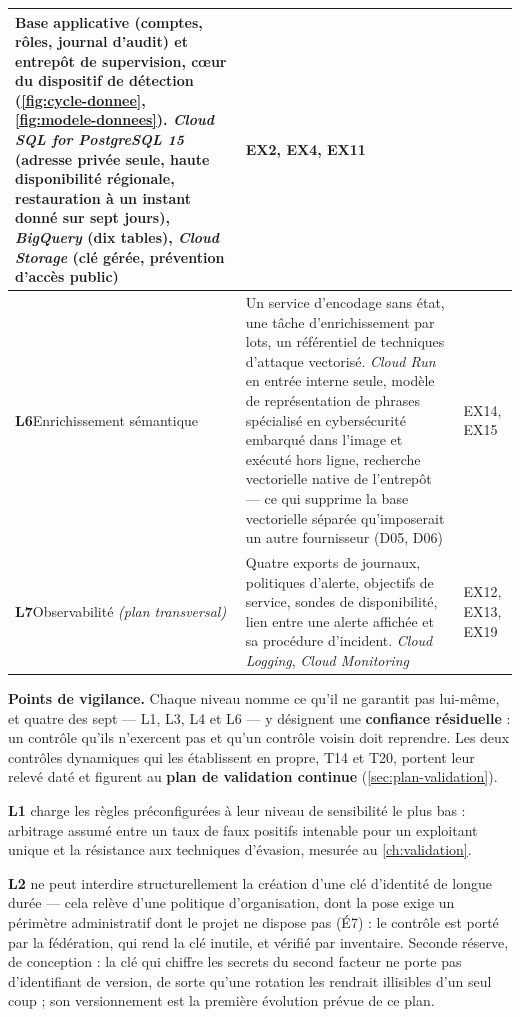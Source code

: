 \begin{longtable}{|P{2.0cm}|P{11.0cm}|P{1.9cm}|}
\textbf{Base applicative} (comptes, rôles, journal d'audit) et \textbf{entrepôt de supervision},
c\oe ur du dispositif de détection (\cref{fig:cycle-donnee}, \cref{fig:modele-donnees}).
\emph{Cloud SQL for PostgreSQL 15} (adresse privée seule, haute disponibilité régionale,
restauration à un instant donné sur sept jours), \emph{BigQuery} (dix tables), \emph{Cloud
Storage} (clé gérée, prévention d'accès public) &
EX2, EX4, EX11 \\ \hline
\textbf{L6}\newline Enrichissement sémantique &
Un service d'encodage sans état, une tâche d'enrichissement par lots, un référentiel de techniques
d'attaque vectorisé. \emph{Cloud Run} en entrée interne seule, modèle de représentation de phrases
spécialisé en cybersécurité embarqué dans l'image et exécuté hors ligne, recherche vectorielle
native de l'entrepôt --- ce qui supprime la base vectorielle séparée qu'imposerait un autre
fournisseur (D05, D06) &
EX14, EX15 \\ \hline
\textbf{L7}\newline Observabilité \emph{(plan transversal)} &
Quatre exports de journaux, politiques d'alerte, objectifs de service, sondes de disponibilité,
lien entre une alerte affichée et sa procédure d'incident. \emph{Cloud Logging}, \emph{Cloud
Monitoring} &
EX12, EX13, EX19 \\
\hline
\end{longtable}
\endgroup

\textbf{Points de vigilance.} Chaque niveau nomme ce qu'il ne garantit pas lui-même, et quatre des
sept --- L1, L3, L4 et L6 --- y désignent une \textbf{confiance résiduelle} : un contrôle qu'ils
n'exercent pas et qu'un contrôle voisin doit reprendre. Les deux contrôles dynamiques qui les
établissent en propre, T14 et T20, portent leur relevé daté et figurent au \textbf{plan de
validation continue} (\cref{sec:plan-validation}).

\textbf{L1} charge les règles préconfigurées à leur niveau de sensibilité le plus bas : arbitrage
assumé entre un taux de faux positifs intenable pour un exploitant unique et la résistance aux
techniques d'évasion, mesurée au \cref{ch:validation}.

\textbf{L2} ne peut interdire structurellement la création d'une clé d'identité de longue durée ---
cela relève d'une politique d'organisation, dont la pose exige un périmètre administratif dont le
projet ne dispose pas (É7) : le contrôle est porté par la fédération, qui rend la clé inutile, et
vérifié par inventaire. Seconde réserve, de conception : la clé qui chiffre les secrets du second
facteur ne porte pas d'identifiant de version, de sorte qu'une rotation les rendrait illisibles d'un
seul coup ; son versionnement est la première évolution prévue de ce plan.


